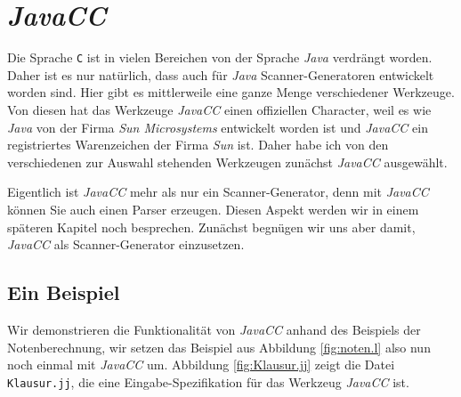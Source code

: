
\section{\textsl{JavaCC}}
Die Sprache \texttt{C} ist in vielen Bereichen von der Sprache \textsl{Java}\/ verdr\"angt
worden.  Daher ist es nur nat\"urlich, dass auch f\"ur \textsl{Java}\/ Scanner-Generatoren
entwickelt worden sind.  Hier gibt es mittlerweile eine ganze Menge verschiedener
Werkzeuge.  Von diesen hat das Werkzeuge \textsl{JavaCC}\/ \cite{kodaganallur:2004}
einen offiziellen Character, weil
es wie \textsl{Java}\/ von der Firma \textsl{Sun \/Microsystems} entwickelt worden ist und
\textsl{JavaCC}\/ ein registriertes Warenzeichen der Firma \textsl{Sun}\/ ist.  Daher habe ich
von den verschiedenen zur Auswahl stehenden Werkzeugen zun\"achst \textsl{JavaCC}\/ ausgew\"ahlt.

Eigentlich ist \textsl{JavaCC}\/ mehr als nur ein Scanner-Generator, denn mit
\textsl{JavaCC}\/ k\"onnen Sie auch einen Parser erzeugen.  Diesen Aspekt werden wir in
einem sp\"ateren Kapitel noch besprechen.  Zun\"achst begn\"ugen wir uns aber damit,
\textsl{JavaCC}\/ als Scanner-Generator einzusetzen.  

\subsection{Ein Beispiel}
Wir demonstrieren die Funktionalit\"at von \textsl{JavaCC}\/
anhand des Beispiels der Notenberechnung, wir setzen das Beispiel aus Abbildung
\ref{fig:noten.l} also nun noch einmal mit \textsl{JavaCC}\/ um.  Abbildung
\ref{fig:Klausur.jj} zeigt die Datei \texttt{Klausur.jj}, die eine Eingabe-Spezifikation
f\"ur das Werkzeug \textsl{JavaCC}\/ ist.  


